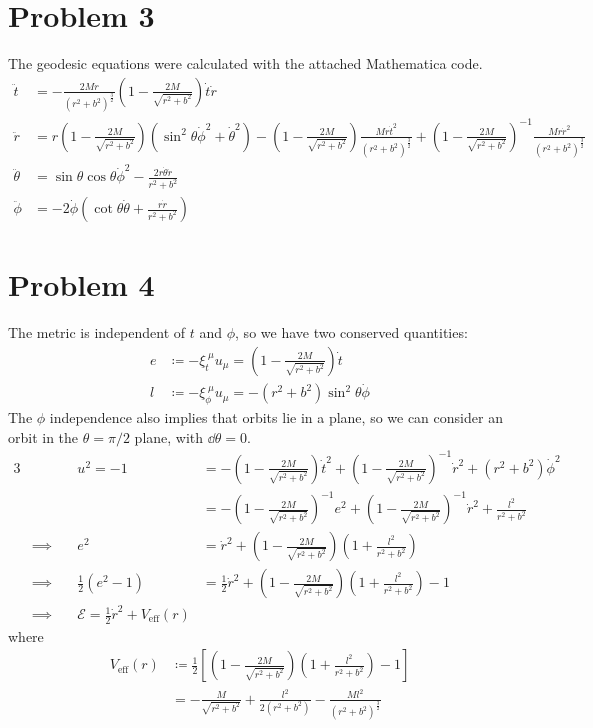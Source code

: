 \documentclass[12pt]{article}
\begin{document}
\section*{Problem 3}
The geodesic equations were calculated with the attached Mathematica code.
\begin{align*}
    \ddot{t} &= -\frac{2Mr}{(r^2 + b^2)^\frac{3}{2}}\left(1 - \frac{2M}{\sqrt{r^2 + b^2}}\right)\dot{t}\dot{r} \\
    \ddot{r} &= r\left(1 - \frac{2M}{\sqrt{r^2 + b^2}}\right)\left(\sin^2\theta\dot{\phi}^2 + \dot{\theta}^2\right) - \left(1 - \frac{2M}{\sqrt{r^2 + b^2}}\right)\frac{Mr\dot{t}^2}{(r^2 + b^2)^\frac{3}{2}} + \left(1 - \frac{2M}{\sqrt{r^2 + b^2}}\right)^{-1}\frac{Mr\dot{r}^2}{(r^2 + b^2)^\frac{3}{2}}\\
    \ddot{\theta} &= \sin\theta\cos\theta\dot{\phi}^2 - \frac{2r\dot{\theta}\dot{r}}{r^2 + b^2} \\
    \ddot{\phi} &= -2\dot{\phi}\left(\cot\theta\dot{\theta} + \frac{r\dot{r}}{r^2 + b^2}\right)
\end{align*}


\section*{Problem 4}
The metric is independent of $t$ and $\phi$, so we have two conserved quantities:
\begin{align*}
    e &\coloneqq -\xi_t^{\;\mu}u_\mu = \left(1 - \frac{2M}{\sqrt{r^2 + b^2}}\right)\dot{t} \\
    l &\coloneqq -\xi_\phi^{\;\mu}u_\mu = -(r^2 + b^2)\sin^2\theta\dot{\phi}
\end{align*}
The $\phi$ independence also implies that orbits lie in a plane, so we can consider an orbit in the $\theta = \pi/2$ plane, with $\dd\theta = 0$.
\begin{alignat}{3}
    & & u^2 = -1 &= -\left(1 - \frac{2M}{\sqrt{r^2 + b^2}}\right)\dot{t}^2 + \left(1 - \frac{2M}{\sqrt{r^2 + b^2}}\right)^{-1}\dot{r}^2 + (r^2 + b^2)\dot{\phi}^2 \nonumber \\
    & &  &= -\left(1 - \frac{2M}{\sqrt{r^2 + b^2}}\right)^{-1}e^2 + \left(1 - \frac{2M}{\sqrt{r^2 + b^2}}\right)^{-1}\dot{r}^2 + \frac{l^2}{r^2 + b^2} \nonumber \\
    &\implies \quad & e^2 &= \dot{r}^2 + \left(1 - \frac{2M}{\sqrt{r^2 + b^2}}\right)\left(1 + \frac{l^2}{r^2 + b^2}\right) \nonumber \\
    &\implies \quad & \frac{1}{2}(e^2 - 1) &= \frac{1}{2}\dot{r}^2 + \left(1 - \frac{2M}{\sqrt{r^2 + b^2}}\right)\left(1 + \frac{l^2}{r^2 + b^2}\right) - 1 \nonumber \\
    &\implies \quad & \mathcal{E} = \frac{1}{2}\dot{r}^2 + V_\text{eff}(r)
\end{alignat}
where
\begin{align}
    V_\text{eff}(r) &\coloneqq \frac{1}{2}\left[\left(1 - \frac{2M}{\sqrt{r^2 + b^2}}\right)\left(1 + \frac{l^2}{r^2 + b^2}\right) - 1\right] \nonumber \\
    &= -\frac{M}{\sqrt{r^2 + b^2}} + \frac{l^2}{2(r^2 + b^2)} - \frac{Ml^2}{(r^2 + b^2)^{\frac{3}{2}}}
\end{align}
\end{document}
